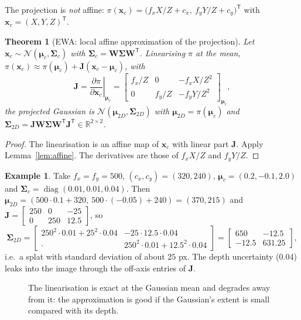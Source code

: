 \documentclass[11pt,a4paper]{article}
\newcommand{\R}{\mathbb{R}}
\newcommand{\T}{^{\mathsf T}}
\newcommand{\N}{\mathcal{N}}
\DeclareMathOperator{\diag}{diag}
\theoremstyle{definition}
\newtheorem{example}[definition]{Example}
\theoremstyle{plain}
\newtheorem{theorem}[definition]{Theorem}
\theoremstyle{remark}
\begin{document}
The projection is \emph{not} affine: $\pi(\bm x_c)=\big(f_xX/Z+c_x,\ f_yY/Z+c_y\big)\T$ with $\bm x_c=(X,Y,Z)\T$.

\begin{theorem}[EWA: local affine approximation of the projection]\label{thm:ewa}
Let $\bm x_c\sim\N(\bm\mu_c,\bm\Sigma_c)$ with $\bm\Sigma_c=\bm W\bm\Sigma\bm W\T$. Linearising $\pi$ at the mean,
$\pi(\bm x_c)\approx\pi(\bm\mu_c)+\bm J(\bm x_c-\bm\mu_c)$, with
\[
\bm J=\left.\frac{\partial\pi}{\partial\bm x_c}\right|_{\bm\mu_c}=
\begin{bmatrix}f_x/Z&0&-f_xX/Z^2\\0&f_y/Z&-f_yY/Z^2\end{bmatrix}_{\bm\mu_c},
\]
the projected Gaussian is $\N(\bm\mu_{2D},\bm\Sigma_{2D})$ with $\bm\mu_{2D}=\pi(\bm\mu_c)$ and
$\bm\Sigma_{2D}=\bm J\bm W\bm\Sigma\bm W\T\bm J\T\in\R^{2\times2}$.
\end{theorem}
\begin{proof}
The linearisation is an affine map of $\bm x_c$ with linear part $\bm J$. Apply Lemma~\ref{lem:affine}. The derivatives are those of $f_xX/Z$ and $f_yY/Z$.
\end{proof}

\begin{example}
Take $f_x=f_y=500$, $(c_x,c_y)=(320,240)$, $\bm\mu_c=(0.2,-0.1,2.0)$ and $\bm\Sigma_c=\diag(0.01,0.01,0.04)$. Then $\bm\mu_{2D}=(500\cdot0.1+320,\ 500\cdot(-0.05)+240)=(370,215)$ and
$\bm J=\begin{bmatrix}250&0&-25\\0&250&12.5\end{bmatrix}$, so
\[
\bm\Sigma_{2D}=\begin{bmatrix}250^2\cdot0.01+25^2\cdot0.04&-25\cdot12.5\cdot0.04\\ \cdot&250^2\cdot0.01+12.5^2\cdot0.04\end{bmatrix}
=\begin{bmatrix}650&-12.5\\-12.5&631.25\end{bmatrix},
\]
i.e.\ a splat with standard deviation of about $25$ px. The depth uncertainty (0.04) leaks into the image through the off-axis entries of $\bm J$.
\end{example}

\begin{figure}[htbp]
\centering
{}
\caption{The linearisation is exact at the Gaussian mean and degrades away from it: the approximation is good if the Gaussian's extent is small compared with its depth.}
\end{figure}
\end{document}
